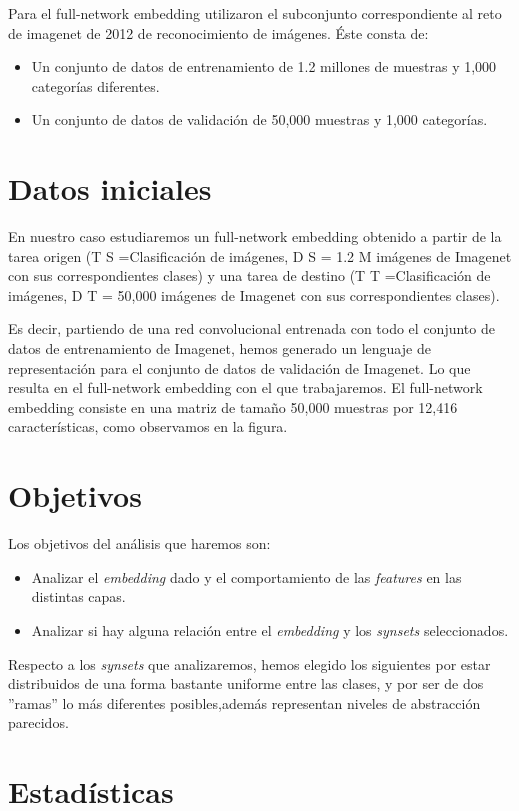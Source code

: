 \documentclass[a4paper,9pt]{extarticle}
\begin{document}
\begin{multicols*}{2}
Para el full-network embedding utilizaron el subconjunto correspondiente al reto de imagenet de 2012
de reconocimiento de imágenes.
Éste consta de:
\begin{itemize}
\item Un conjunto de datos de entrenamiento de 1.2 millones de muestras y 1,000 categorías diferentes.
\item Un conjunto de datos de validación de 50,000 muestras y 1,000 categorías.
\end{itemize}

\section{Datos iniciales}
En nuestro caso estudiaremos un full-network embedding obtenido a partir de la tarea origen (T S =Clasificación
de imágenes, D S = 1.2 M imágenes de Imagenet con sus correspondientes clases) y una tarea de destino
(T T =Clasificación de imágenes, D T = 50,000 imágenes de Imagenet con sus correspondientes clases).

Es decir, partiendo de una red convolucional entrenada con todo el conjunto de datos de entrenamiento
de Imagenet, hemos generado un lenguaje de representación para el conjunto de datos de validación de
Imagenet. Lo que resulta en el full-network embedding con el que trabajaremos.
El full-network embedding consiste en una matriz de tamaño 50,000 muestras por 12,416 características,
como observamos en la figura.


\section{Objetivos}
Los objetivos del análisis que haremos son: 
\begin{itemize}
\item Analizar el \textit{embedding} dado y el comportamiento de las \textit{features} en las distintas capas.
\item Analizar si hay alguna relación entre el \textit{embedding} y los \textit{synsets} seleccionados.
\end{itemize}
Respecto a los \textit{synsets} que analizaremos, hemos elegido los siguientes por estar distribuidos de una forma bastante uniforme entre las
clases, y por ser de dos ''ramas'' lo más diferentes posibles,además representan niveles de abstracción parecidos.

\section{Estadísticas}


\end{multicols*}
\end{document}
